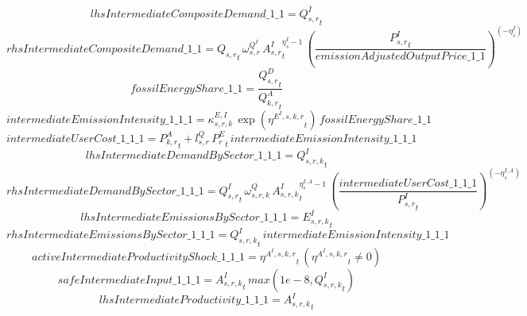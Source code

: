 \begin{dmath*}
lhsIntermediateCompositeDemand\_1\_1 = {{Q^{I}_{s,r}}}_{t}
\end{dmath*}
\begin{dmath*}
rhsIntermediateCompositeDemand\_1\_1 = {{Q_{s,r}}}_{t}\, {{\omega^{Q^{I}}_{s,r}}}\, {{A^{I}_{s,r}}}_{t}^{{{\eta^{I}_{s}}}-1}\, \left(\frac{{{P^{I}_{s,r}}}_{t}}{{emissionAdjustedOutputPrice\_1\_1}}\right)^{\left(-{{\eta^{I}_{s}}}\right)}
\end{dmath*}
\begin{dmath*}
fossilEnergyShare\_1\_1 = \frac{{{Q^{D}_{s,r}}}_{t}}{{{Q^{A}_{k,r}}}_{t}}
\end{dmath*}
\begin{dmath*}
intermediateEmissionIntensity\_1\_1\_1 = {{\kappa^{E,I}_{s,r,k}}}\, \exp\left({{\eta^{E^{I},s,k,r}}}_{t}\right)\, {fossilEnergyShare\_1\_1}
\end{dmath*}
\begin{dmath*}
intermediateUserCost\_1\_1\_1 = {{P^{A}_{k,r}}}_{t}+{{l^{Q}_{s,r}}}\, {{P^E_r}}_{t}\, {intermediateEmissionIntensity\_1\_1\_1}
\end{dmath*}
\begin{dmath*}
lhsIntermediateDemandBySector\_1\_1\_1 = {{Q^{I}_{s,r,k}}}_{t}
\end{dmath*}
\begin{dmath*}
rhsIntermediateDemandBySector\_1\_1\_1 = {{Q^{I}_{s,r}}}_{t}\, {{\omega^{Q}_{s,r,k}}}\, {{A^{I}_{s,r,k}}}_{t}^{{{\eta^{I,A}_{s}}}-1}\, \left(\frac{{intermediateUserCost\_1\_1\_1}}{{{P^{I}_{s,r}}}_{t}}\right)^{\left(-{{\eta^{I,A}_{s}}}\right)}
\end{dmath*}
\begin{dmath*}
lhsIntermediateEmissionsBySector\_1\_1\_1 = {{E^I_{s,r,k}}}_{t}
\end{dmath*}
\begin{dmath*}
rhsIntermediateEmissionsBySector\_1\_1\_1 = {{Q^{I}_{s,r,k}}}_{t}\, {intermediateEmissionIntensity\_1\_1\_1}
\end{dmath*}
\begin{dmath*}
activeIntermediateProductivityShock\_1\_1\_1 = {{\eta^{A^{I},s,k,r}}}_{t}\, \left({{\eta^{A^{I},s,k,r}}}_{t}\neq 0\right)
\end{dmath*}
\begin{dmath*}
safeIntermediateInput\_1\_1\_1 = {{A^{I}_{s,r,k}}}_{t}\, max(1e-8,{{Q^{I}_{s,r,k}}}_{t})
\end{dmath*}
\begin{dmath*}
lhsIntermediateProductivity\_1\_1\_1 = {{A^{I}_{s,r,k}}}_{t}
\end{dmath*}
